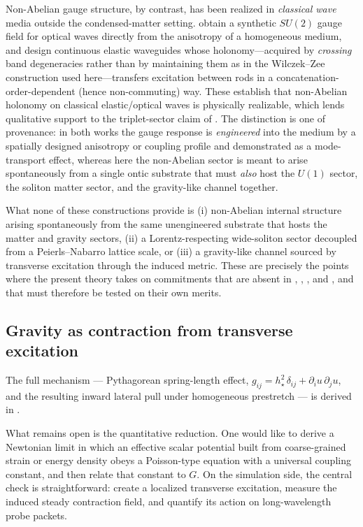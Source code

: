 Non-Abelian gauge structure, by contrast, has been realized in \emph{classical wave} media outside the
condensed-matter setting.
\citet{Chen2019NonAbelianOptics} obtain a synthetic $SU(2)$ gauge field for optical waves directly from the
anisotropy of a homogeneous medium, and \citet{Kumar2026NonabelianElastic} design continuous elastic waveguides
whose holonomy---acquired by \emph{crossing} band degeneracies rather than by maintaining them as in the
Wilczek--Zee construction used here---transfers excitation between rods in a concatenation-order-dependent
(hence non-commuting) way.
These establish that non-Abelian holonomy on classical elastic/optical waves is physically realizable, which
lends qualitative support to the triplet-sector claim of .
The distinction is one of provenance: in both works the gauge response is \emph{engineered} into the medium by a
spatially designed anisotropy or coupling profile and demonstrated as a mode-transport effect, whereas here the
non-Abelian sector is meant to arise spontaneously from a single ontic substrate that must \emph{also} host the
$U(1)$ sector, the soliton matter sector, and the gravity-like channel together.

What none of these constructions provide is (i) non-Abelian internal structure arising spontaneously from the
same unengineered substrate that hosts the matter and gravity sectors, (ii) a Lorentz-respecting wide-soliton
sector decoupled from a Peierls--Nabarro lattice scale, or (iii) a gravity-like channel sourced by transverse
excitation through the induced metric.
These are precisely the points where the present theory takes on commitments that are absent in
\citet{HanKivelson2024EmergentGauge}, \citet{GingrasMcClarty2014QSI}, \citet{Chen2019NonAbelianOptics}, and
\citet{Kumar2026NonabelianElastic}, and that must therefore be tested on their own merits.

\subsection{Gravity as contraction from transverse excitation}

The full mechanism --- Pythagorean spring-length effect, $g_{ij}=h_\star^2\,\delta_{ij}+\partial_i u\,\partial_j u$,
and the resulting inward lateral pull under homogeneous prestretch --- is derived in .

What remains open is the quantitative reduction.
One would like to derive a Newtonian limit in which an effective scalar potential built from coarse-grained strain or
energy density obeys a Poisson-type equation with a universal coupling constant, and then relate that constant to $G$.
On the simulation side, the central check is straightforward: create a localized transverse excitation, measure the
induced steady contraction field, and quantify its action on long-wavelength probe packets.

